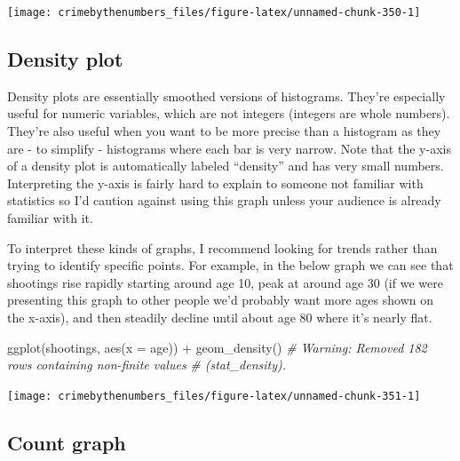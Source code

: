 \documentclass[
  a4paper,
]{krantz}
\makeatletter
\newenvironment{Shaded}{\begin{snugshade}}{\end{snugshade}}
\newcommand{\AttributeTok}[1]{\textcolor[rgb]{0.77,0.63,0.00}{#1}}
\newcommand{\CommentTok}[1]{\textcolor[rgb]{0.56,0.35,0.01}{\textit{#1}}}
\newcommand{\FunctionTok}[1]{\textcolor[rgb]{0.00,0.00,0.00}{#1}}
\newcommand{\NormalTok}[1]{#1}
\newcommand{\SpecialCharTok}[1]{\textcolor[rgb]{0.00,0.00,0.00}{#1}}
\newenvironment{kframe}{%
\medskip{}
\setlength{\fboxsep}{.8em}
 \def\at@end@of@kframe{}%
 \ifinner\ifhmode%
  \def\at@end@of@kframe{\end{minipage}}%
  \begin{minipage}{\columnwidth}%
 \fi\fi%
 \def\FrameCommand##1{\hskip\@totalleftmargin \hskip-\fboxsep
 \colorbox{shadecolor}{##1}\hskip-\fboxsep
     \hskip-\linewidth \hskip-\@totalleftmargin \hskip\columnwidth}%
 \MakeFramed {\advance\hsize-\width
   \@totalleftmargin\z@ \linewidth\hsize
   \@setminipage}}%
 {\par\unskip\endMakeFramed%
 \at@end@of@kframe}
\renewenvironment{Shaded}{\begin{kframe}}{\end{kframe}}
\makeatother
\begin{document}
\begin{center}\texttt{[image: crimebythenumbers\_files/figure-latex/unnamed-chunk-350-1]} \end{center}

\hypertarget{density-plot}{%
\subsection{Density plot}\label{density-plot}}

Density plots are essentially smoothed versions of
histograms. They're especially useful for numeric variables,
which are not integers (integers are whole numbers). They're
also useful when you want to be more precise than a
histogram as they are - to simplify - histograms where each
bar is very narrow. Note that the y-axis of a density plot
is automatically labeled ``density'' and has very small
numbers. Interpreting the y-axis is fairly hard to explain
to someone not familiar with statistics so I'd caution
against using this graph unless your audience is already
familiar with it.

To interpret these kinds of graphs, I recommend looking for
trends rather than trying to identify specific points. For
example, in the below graph we can see that shootings rise
rapidly starting around age 10, peak at around age 30 (if we
were presenting this graph to other people we'd probably
want more ages shown on the x-axis), and then steadily
decline until about age 80 where it's nearly flat.

\begin{Shaded}
\begin{Highlighting}[]
\FunctionTok{ggplot}\NormalTok{(shootings, }\FunctionTok{aes}\NormalTok{(}\AttributeTok{x =}\NormalTok{ age)) }\SpecialCharTok{+}
  \FunctionTok{geom\_density}\NormalTok{()}
\CommentTok{\# Warning: Removed 182 rows containing non{-}finite values}
\CommentTok{\# (stat\_density).}
\end{Highlighting}
\end{Shaded}

\begin{center}\texttt{[image: crimebythenumbers\_files/figure-latex/unnamed-chunk-351-1]} \end{center}

\hypertarget{count-graph}{%
\subsection{Count graph}\label{count-graph}}
\end{document}
